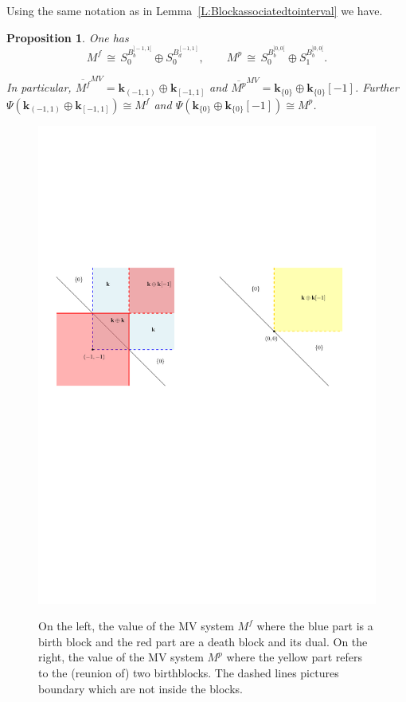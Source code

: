 \documentclass[a4paper, english, 11pt]{article}
\newcommand{\kk}[0]{\textbf{k}}
\newcommand{\0}{\vec{0}}
\newtheorem{prop}{Proposition}[section]
\begin{document}
Using the same notation as in Lemma~\ref{L:Blockassociatedtointerval} we have.
\begin{prop}\label{P:exofcircleproj}
 One has $$M^f \, \cong\, S_0^{B_b^{]-1,1[}}\oplus S_0^{B_d^{[-1,1]}}, \qquad 
 M^p \, \cong\, S_0^{B_b^{]0,0[}}\oplus S_1^{B_b^{]0,0[}}.$$
 
 In particular,  $\overline{M^f}^{MV} =\kk_{(-1,1)} \oplus \kk_{[-1,1]}$ and  $\overline{M^p}^{MV} = \kk_{\{0\}} \oplus \kk_{\{0\}}[-1]$. Further $\Psi(\kk_{(-1,1)} \oplus \kk_{[-1,1]}) \cong M^f$ and $\Psi (\kk_{\{0\}} \oplus \kk_{\{0\}}[-1]) \cong M^p$.
\end{prop}
\begin{figure}
\begin{center}
\includegraphics[scale=0.8]{exemple2.pdf}
\label{fig:moduleforcircle}
\caption{On the left, the value of the  MV system $M^f$ where the blue part is a birth block and the red part are a death block and its dual. On the right, the value of the MV system $M^p$ where the yellow part refers to the (reunion of) two birthblocks. 
The dashed lines pictures boundary which are not inside the blocks. }
\end{center}
\end{figure}
\end{document}
